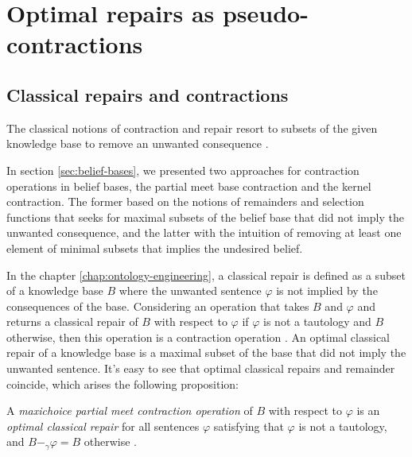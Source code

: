 
\chapter{Optimal repairs as pseudo-contractions}

\section{Classical repairs and contractions}

The classical notions of contraction and repair resort to subsets of the given knowledge base to remove an unwanted consequence \citep{Baader-SAC23}. 

In section \ref{sec:belief-bases}, we presented two approaches for contraction operations in belief bases, the partial meet base contraction and the kernel contraction. The former based on the notions of remainders and selection functions that seeks for maximal subsets of the belief base that did not imply the unwanted consequence, and the latter with the intuition of removing at least one element of minimal subsets that implies the undesired belief.

In the chapter \ref{chap:ontology-engineering}, a classical repair is defined as a subset of a knowledge base $B$ where the unwanted sentence $\varphi$ is not implied by the consequences of the base. Considering an operation that takes $B$ and $\varphi$ and returns a classical repair of $B$ with respect to $\varphi$ if $\varphi$ is not a tautology and $B$ otherwise, then this operation is a contraction operation \citep{Baader-SAC23, Matos2019}. An optimal classical repair of a knowledge base is a maximal subset of the base that did not imply the unwanted sentence. It's easy to see that optimal classical repairs and remainder coincide, which arises the following proposition:

\begin{proposition}
    A \textit{maxichoice partial meet contraction operation} of $B$ with respect to $\varphi$ is an \textit{optimal classical repair} for all sentences $\varphi$ satisfying that $\varphi$ is not a tautology, and $B -_{\gamma} \varphi = B$ otherwise \citep{Baader-SAC23}.
\end{proposition}

